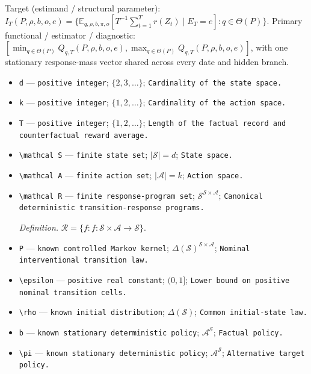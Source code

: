 \documentclass{article}
\begin{document}
Target (estimand / structural parameter): \(I_T(P,\rho,b,o,e)=\{\mathbb E_{q,\rho,b,\pi,o}[T^{-1}\sum_{t=1}^T r(Z_t)\mid E_T=e]:q\in\Theta(P)\}\).
Primary functional / estimator / diagnostic: \([\min_{q\in\Theta(P)}Q_{q,T}(P,\rho,b,o,e),\max_{q\in\Theta(P)}Q_{q,T}(P,\rho,b,o,e)]\), with one stationary response-mass vector shared across every date and hidden branch.
\begin{itemize}
  \item \texttt{d} --- \texttt{positive integer}; \(\{2,3,\ldots\}\); \texttt{Cardinality of the state space.}
  \item \texttt{k} --- \texttt{positive integer}; \(\{1,2,\ldots\}\); \texttt{Cardinality of the action space.}
  \item \texttt{T} --- \texttt{positive integer}; \(\{1,2,\ldots\}\); \texttt{Length of the factual record and counterfactual reward average.}
  \item \texttt{\textbackslash{}\allowbreak{}mathcal S} --- \texttt{finite state set}; \(|\mathcal S|=d\); \texttt{State space.}
  \item \texttt{\textbackslash{}\allowbreak{}mathcal A} --- \texttt{finite action set}; \(|\mathcal A|=k\); \texttt{Action space.}
  \item \texttt{\textbackslash{}\allowbreak{}mathcal R} --- \texttt{finite response-\allowbreak{}program set}; \(\mathcal S^{\mathcal S\times\mathcal A}\); \texttt{Canonical deterministic transition-\allowbreak{}response programs.}
  \par\smallskip\noindent\emph{Definition.} \(\mathcal R=\{f: f:\mathcal S\times\mathcal A\to\mathcal S\}\).
  \item \texttt{P} --- \texttt{known controlled Markov kernel}; \(\Delta(\mathcal S)^{\mathcal S\times\mathcal A}\); \texttt{Nominal interventional transition law.}
  \item \texttt{\textbackslash{}\allowbreak{}epsilon} --- \texttt{positive real constant}; \((0,1]\); \texttt{Lower bound on positive nominal transition cells.}
  \item \texttt{\textbackslash{}\allowbreak{}rho} --- \texttt{known initial distribution}; \(\Delta(\mathcal S)\); \texttt{Common initial-\allowbreak{}state law.}
  \item \texttt{b} --- \texttt{known stationary deterministic policy}; \(\mathcal A^{\mathcal S}\); \texttt{Factual policy.}
  \item \texttt{\textbackslash{}\allowbreak{}pi} --- \texttt{known stationary deterministic policy}; \(\mathcal A^{\mathcal S}\); \texttt{Alternative target policy.}

\end{itemize}
\end{document}
